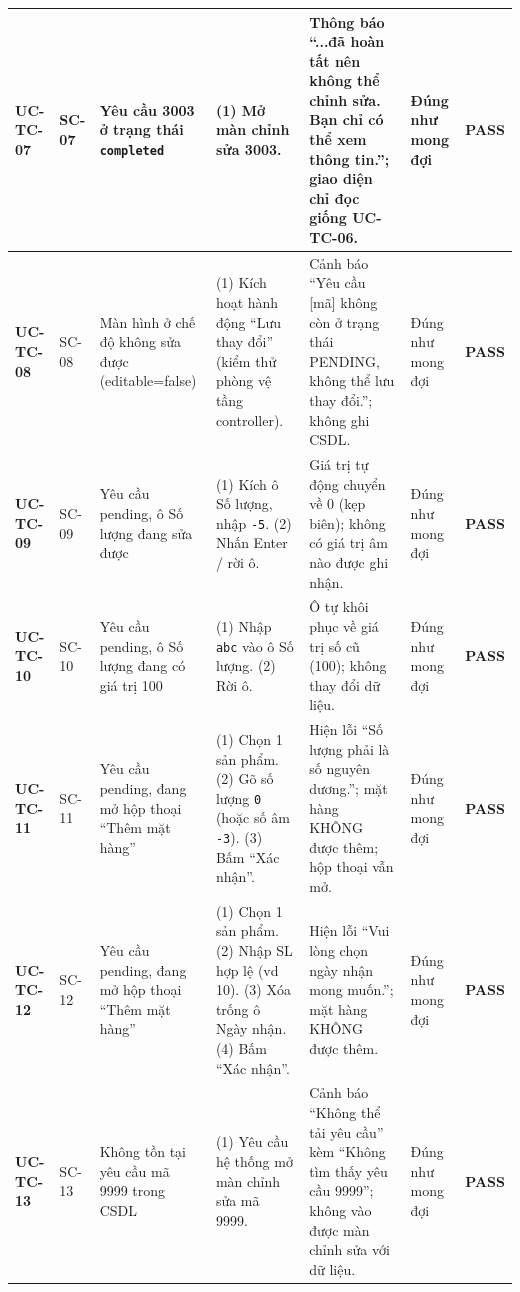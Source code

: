 \documentclass[12pt,a4paper]{article}
\begin{document}
\begin{landscape}
{\begin{longtable}{|p{1.4cm}|p{1.2cm}|p{3.4cm}|p{7.2cm}|p{5.4cm}|p{2.6cm}|p{1.4cm}|}
\textbf{UC-TC-07} & SC-07 & Yêu cầu 3003 ở trạng thái \texttt{completed} & (1) Mở màn chỉnh sửa 3003. & Thông báo ``...đã hoàn tất nên không thể chỉnh sửa. Bạn chỉ có thể xem thông tin.''; giao diện chỉ đọc giống UC-TC-06. & Đúng như mong đợi & \textbf{PASS}\\ \hline
\textbf{UC-TC-08} & SC-08 & Màn hình ở chế độ không sửa được (editable=false) & (1) Kích hoạt hành động ``Lưu thay đổi'' (kiểm thử phòng vệ tầng controller). & Cảnh báo ``Yêu cầu [mã] không còn ở trạng thái PENDING, không thể lưu thay đổi.''; không ghi CSDL. & Đúng như mong đợi & \textbf{PASS}\\ \hline
\textbf{UC-TC-09} & SC-09 & Yêu cầu pending, ô Số lượng đang sửa được & (1) Kích ô Số lượng, nhập \texttt{-5}. (2) Nhấn Enter / rời ô. & Giá trị tự động chuyển về 0 (kẹp biên); không có giá trị âm nào được ghi nhận. & Đúng như mong đợi & \textbf{PASS}\\ \hline
\textbf{UC-TC-10} & SC-10 & Yêu cầu pending, ô Số lượng đang có giá trị 100 & (1) Nhập \texttt{abc} vào ô Số lượng. (2) Rời ô. & Ô tự khôi phục về giá trị số cũ (100); không thay đổi dữ liệu. & Đúng như mong đợi & \textbf{PASS}\\ \hline
\textbf{UC-TC-11} & SC-11 & Yêu cầu pending, đang mở hộp thoại ``Thêm mặt hàng'' & (1) Chọn 1 sản phẩm. (2) Gõ số lượng \texttt{0} (hoặc số âm \texttt{-3}). (3) Bấm ``Xác nhận''. & Hiện lỗi ``Số lượng phải là số nguyên dương.''; mặt hàng KHÔNG được thêm; hộp thoại vẫn mở. & Đúng như mong đợi & \textbf{PASS}\\ \hline
\textbf{UC-TC-12} & SC-12 & Yêu cầu pending, đang mở hộp thoại ``Thêm mặt hàng'' & (1) Chọn 1 sản phẩm. (2) Nhập SL hợp lệ (vd 10). (3) Xóa trống ô Ngày nhận. (4) Bấm ``Xác nhận''. & Hiện lỗi ``Vui lòng chọn ngày nhận mong muốn.''; mặt hàng KHÔNG được thêm. & Đúng như mong đợi & \textbf{PASS}\\ \hline
\textbf{UC-TC-13} & SC-13 & Không tồn tại yêu cầu mã 9999 trong CSDL & (1) Yêu cầu hệ thống mở màn chỉnh sửa mã 9999. & Cảnh báo ``Không thể tải yêu cầu'' kèm ``Không tìm thấy yêu cầu 9999''; không vào được màn chỉnh sửa với dữ liệu. & Đúng như mong đợi & \textbf{PASS}\\ \hline
\end{longtable}
}
\end{landscape}
\end{document}
